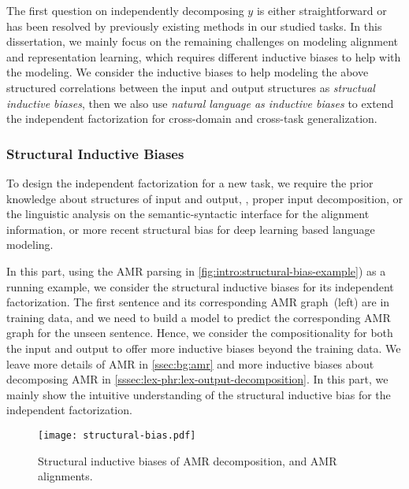 {The first question on independently decomposing $y$ is either
straightforward or has been resolved by previously existing methods in
our studied tasks. In this dissertation, we mainly focus on the remaining
challenges on modeling alignment and representation learning, which
requires different inductive biases to help with the
modeling. We consider the inductive biases to
help modeling the above structured correlations between the input and
output structures as \emph{structual inductive biases}, then we also
use \emph{natural language as inductive biases} to extend the
independent factorization for cross-domain and cross-task
generalization.

\subsubsection{Structural Inductive Biases}
\label{sssec:intro:structural-biases}
To design the independent factorization for a new task, we require the
prior knowledge about structures of input and output, \eg, proper
input decomposition, or the linguistic analysis on the
semantic-syntactic interface for the alignment information, or more
recent structural bias for deep learning based language modeling.

In this part, using the AMR parsing in
\autoref{fig:intro:structural-bias-example}) as a running example, we
consider the structural inductive biases for its independent
factorization. The first sentence and its corresponding AMR
graph~(left) are in training data, and we need to build a model to
predict the corresponding AMR graph for the unseen sentence. Hence, we
consider the compositionality for both the input and output to offer
more inductive biases beyond the training data. We leave more details
of AMR in \autoref{ssec:bg:amr} and more inductive biases about
decomposing AMR in
\autoref{sssec:lex-phr:lex-output-decomposition}. In this part, we
mainly show the intuitive understanding of the structural inductive
bias for the independent factorization.

\begin{figure}[!tbp]
  \centering
  \texttt{[image: structural-bias.pdf]}
  \caption{\label{fig:intro:structural-bias-example} Structural inductive
    biases of AMR decomposition, and AMR alignments.}
\end{figure}

}
